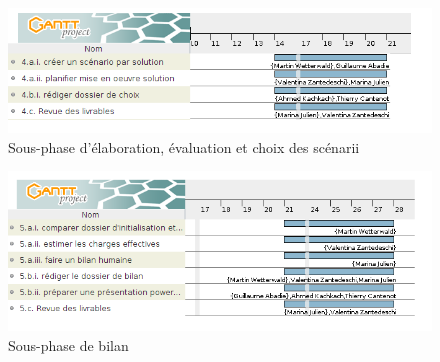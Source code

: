 \begin{figure}[h]
    \centering
    \includegraphics[scale=0.65]{./images/SPIE_4.png}
    \caption{Sous-phase d'élaboration, évaluation et choix des scénarii}
    \label{diagram:si_map}
\end{figure}

\begin{figure}[h]
    \centering
    \includegraphics[scale=0.65]{./images/SPIE_5.png}
    \caption{Sous-phase de bilan}
    \label{diagram:si_map}
\end{figure}